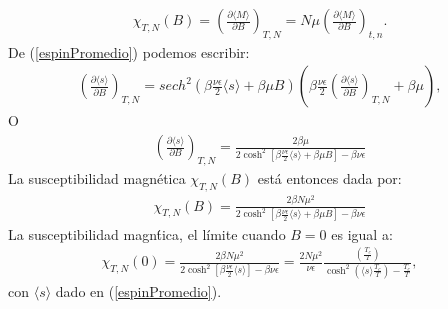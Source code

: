 \documentclass[letterpaper,12pt,oneside]{book}
\begin{document}
%
\begin{eqnarray}
\chi_{T,N} (B) = \left(\frac{\partial \langle M \rangle}{\partial B} \right)_{T,N} = N\mu \left(\frac{\partial \langle M \rangle}{\partial B} \right)_{t,n}.
\end{eqnarray}
%
De (\ref{espinPromedio}) podemos escribir:
%
\begin{eqnarray}
\left(\frac{\partial \langle s \rangle}{\partial B}\right)_{T,N} = sech^2 \left(\beta \frac{\nu \epsilon}{2}\langle s \rangle + \beta \mu B\right)\left(\beta \frac{\nu \epsilon}{2}\left(\frac{\partial \langle s \rangle}{\partial B} \right)_{T,N} + \beta \mu \right), 
\end{eqnarray}
%
O
%
\begin{eqnarray}
\left(\frac{\partial\langle s \rangle}{\partial B}\right)_{T,N} = \frac{2\beta \mu}{2\cosh^2 \left[\beta  \frac{\nu \epsilon}{2}\langle s \rangle + \beta \mu B\right] - \beta \nu \epsilon}
\end{eqnarray}
%
La susceptibilidad magn\'etica $\chi_{T,N}(B)$ est\'a entonces dada por:
%
\begin{eqnarray}
\chi_{T,N}(B) = \frac{2\beta N \mu^2}{2 \cosh^2 \left[\beta \frac{\nu \epsilon}{2} \langle s \rangle + \beta \mu B\right]-\beta \nu \epsilon} 
\end{eqnarray}
%
La susceptibilidad magn\'tica, el l\'imite cuando $B=0$ es igual a:
%
\begin{eqnarray}
\chi_{T,N}(0) =\frac{2\beta N \mu^2}{2 \cosh^2 \left[\beta \frac{\nu \epsilon}{2} \langle s \rangle \right]-\beta \nu \epsilon} = \frac{2 N \mu^2}{\nu \epsilon}\frac{\left(\frac{T_c}{T}\right)}{\cosh^2\left(\langle s \rangle \frac{T_c}{T} \right) - \frac{T_c}{T}},
\end{eqnarray}
%
con $\langle s \rangle$ dado en (\ref{espinPromedio}).
\end{document}
